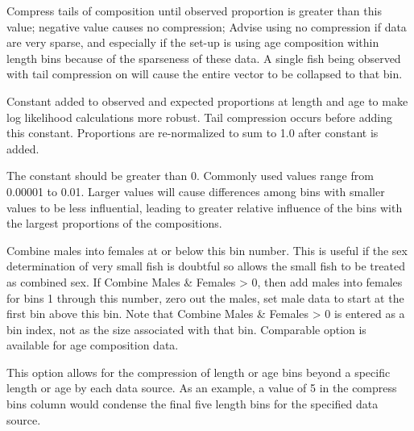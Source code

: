 
Compress tails of composition until observed proportion is greater than this value; negative value causes no compression; Advise using no compression if data are very sparse, and especially if the set-up is using age composition within length bins because of the sparseness of these data. A single fish being observed with tail compression on will cause the entire vector to be collapsed to that bin.

Constant added to observed and expected proportions at length and age to make log likelihood calculations more robust. Tail compression occurs before adding this constant. Proportions are re-normalized to sum to 1.0 after constant is added.

The constant should be greater than 0. Commonly used values range from 0.00001 to 0.01. Larger values will cause differences among bins with smaller values to be less influential, leading to greater relative influence of the bins with the largest proportions of the compositions.

Combine males into females at or below this bin number. This is useful if the sex determination of very small fish is doubtful so allows the small fish to be treated as combined sex. If Combine Males \& Females > 0, then add males into females for bins 1 through this number, zero out the males, set male data to start at the first bin above this bin. Note that Combine Males \& Females > 0 is entered as a bin index, not as the size associated with that bin. Comparable option is available for age composition data.

This option allows for the compression of length or age bins beyond a specific length or age by each data source. As an example, a value of 5 in the compress bins column would condense the final five length bins for the specified data source.

